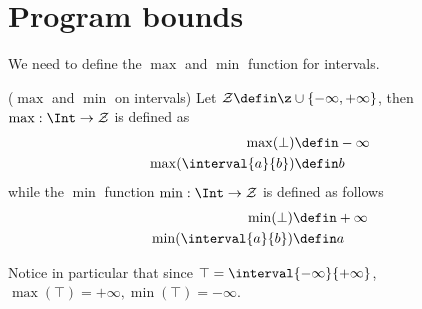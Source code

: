 \section{Program bounds}\label{sec:bounds}
We need to define the \(\max\) and \(\min\) function for
intervals. 
\begin{definition}(\(\max\) and \(\min\) on intervals) Let
  \(\mathcal{Z} \defin \z \cup \{-\infty, +\infty\}\), then
  \(\max : \Int \to \mathcal{Z}\) is defined as
  \begin{align*}
    \max(\bot) & \defin - \infty \\
    \max(\interval{a}{b}) & \defin b
  \end{align*}
  while the \(\min\) function \(\min : \Int \to \mathcal{Z}\)
  is defined as follows
  \begin{align*}
    \min(\bot) & \defin + \infty \\
    \min(\interval{a}{b}) & \defin a
  \end{align*}
\end{definition}
Notice in particular that since
\(\top = \interval{-\infty}{+\infty}\),
\(\max(\top) = +\infty, \min(\top) = -\infty\).

